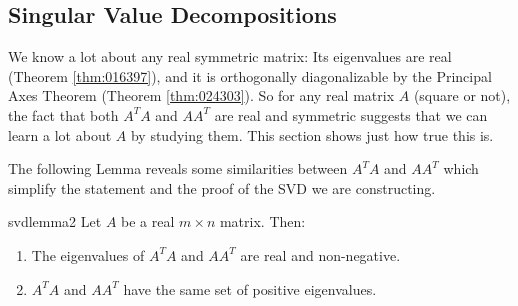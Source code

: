 \subsection{Singular Value Decompositions}

\noindent We know a lot about any real symmetric matrix: Its eigenvalues are
real (Theorem \ref{thm:016397}), and it is orthogonally diagonalizable by the Principal
Axes Theorem (Theorem \ref{thm:024303}). So for any real matrix $A$ (square or not),
the fact that both $A^{T}A$ and $AA^{T}$ are real and symmetric suggests
that we can learn a lot about $A$ by studying them. This section shows just
how true this is.

The following Lemma reveals some similarities between $A^{T}A$ and $AA^{T}$
which simplify the statement and the proof of the SVD we are constructing.

\begin{lemma}{}{svdlemma2}
 Let $A$ be a real $m\times n$ matrix. Then:

\begin{enumerate}
\item The eigenvalues of $A^{T}A$ and $AA^{T}$ are real and non-negative.

\item $A^{T}A$ and $AA^{T}$ have the same set of positive eigenvalues.
\end{enumerate}
\end{lemma}

